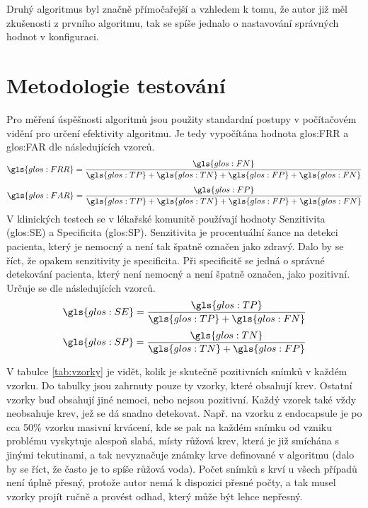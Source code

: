Druhý algoritmus byl značně přímočařejší a vzhledem k tomu, že autor již měl zkušenosti z prvního algoritmu, tak se spíše jednalo o nastavování správných hodnot v konfiguraci.

\section{Metodologie testování}
\label{sec:metodologie}
Pro měření úspěšnosti algoritmů jsou použity standardní postupy v počítačovém vidění pro určení efektivity algoritmu. Je tedy vypočítána hodnota \gls{glos:FRR} a \gls{glos:FAR} dle následujících vzorců.
\begin{equation*}
\gls{glos:FRR} = \frac{\gls{glos:FN}}{\gls{glos:TP}+\gls{glos:TN}+\gls{glos:FP}+\gls{glos:FN}} 
\end{equation*}
\begin{equation*}
\gls{glos:FAR} = \frac{\gls{glos:FP}}{\gls{glos:TP}+\gls{glos:TN}+\gls{glos:FP}+\gls{glos:FN}} 
\end{equation*}
V klinických testech se v lékařské komunitě používají hodnoty Senzitivita (\gls{glos:SE}) a Specificita (\gls{glos:SP})\cite{clinical}. Senzitivita je procentuální šance na detekci pacienta, který je nemocný a není tak špatně označen jako zdravý. Dalo by se říct, že opakem senzitivity je specificita. Při specificitě se jedná o správné detekování pacienta, který není nemocný a není špatně označen, jako pozitivní. Určuje se dle následujících vzorců.
\begin{equation*}
\gls{glos:SE} = \frac{\gls{glos:TP}}{\gls{glos:TP}+\gls{glos:FN}} 
\end{equation*}
\begin{equation*}
\gls{glos:SP} = \frac{\gls{glos:TN}}{\gls{glos:TN}+\gls{glos:FP}} 
\end{equation*}

V tabulce \ref{tab:vzorky} je vidět, kolik je skutečně pozitivních snímků v každém vzorku. Do tabulky jsou zahrnuty pouze ty vzorky, které obsahují krev. Ostatní vzorky buď obsahují jiné nemoci, nebo nejsou pozitivní. Každý vzorek také vždy neobsahuje krev, jež se dá snadno detekovat. Např. na vzorku z endocapsule je po cca 50\% vzorku masivní krvácení, kde se pak na každém snímku od vzniku problému vyskytuje alespoň slabá, místy růžová krev, která je již smíchána s jinými tekutinami, a tak nevyznačuje známky krve definované v algoritmu (dalo by se říct, že často je to spíše růžová voda). Počet snímků s krví u všech případů není úplně přesný, protože autor nemá k dispozici přesné počty, a tak musel vzorky projít ručně a provést odhad, který může být lehce nepřesný.

